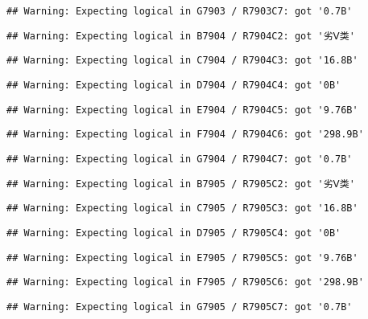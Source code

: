 \documentclass[
]{article}
\begin{document}
\begin{verbatim}
## Warning: Expecting logical in G7903 / R7903C7: got '0.7B'
\end{verbatim}

\begin{verbatim}
## Warning: Expecting logical in B7904 / R7904C2: got '劣Ⅴ类'
\end{verbatim}

\begin{verbatim}
## Warning: Expecting logical in C7904 / R7904C3: got '16.8B'
\end{verbatim}

\begin{verbatim}
## Warning: Expecting logical in D7904 / R7904C4: got '0B'
\end{verbatim}

\begin{verbatim}
## Warning: Expecting logical in E7904 / R7904C5: got '9.76B'
\end{verbatim}

\begin{verbatim}
## Warning: Expecting logical in F7904 / R7904C6: got '298.9B'
\end{verbatim}

\begin{verbatim}
## Warning: Expecting logical in G7904 / R7904C7: got '0.7B'
\end{verbatim}

\begin{verbatim}
## Warning: Expecting logical in B7905 / R7905C2: got '劣Ⅴ类'
\end{verbatim}

\begin{verbatim}
## Warning: Expecting logical in C7905 / R7905C3: got '16.8B'
\end{verbatim}

\begin{verbatim}
## Warning: Expecting logical in D7905 / R7905C4: got '0B'
\end{verbatim}

\begin{verbatim}
## Warning: Expecting logical in E7905 / R7905C5: got '9.76B'
\end{verbatim}

\begin{verbatim}
## Warning: Expecting logical in F7905 / R7905C6: got '298.9B'
\end{verbatim}

\begin{verbatim}
## Warning: Expecting logical in G7905 / R7905C7: got '0.7B'
\end{verbatim}
\end{document}
